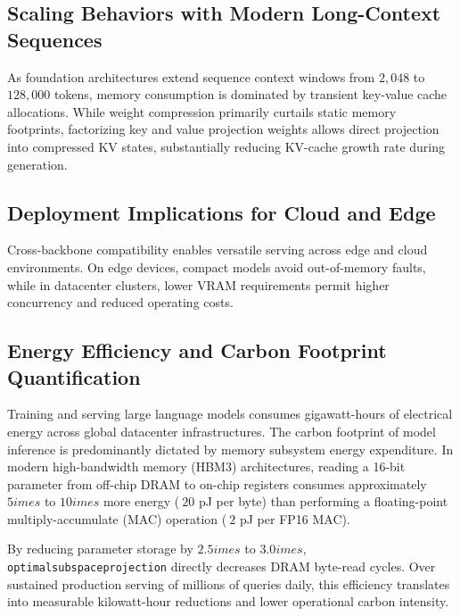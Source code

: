 \subsection{Scaling Behaviors with Modern Long-Context Sequences}
As foundation architectures extend sequence context windows from $2{,}048$ to $128{,}000$ tokens, memory consumption is dominated by transient key-value cache allocations. While weight compression primarily curtails static memory footprints, factorizing key and value projection weights allows direct projection into compressed KV states, substantially reducing KV-cache growth rate during generation.

\subsection{Deployment Implications for Cloud and Edge}
Cross-backbone compatibility enables versatile serving across edge and cloud environments. On edge devices, compact models avoid out-of-memory faults, while in datacenter clusters, lower VRAM requirements permit higher concurrency and reduced operating costs.

\subsection{Energy Efficiency and Carbon Footprint Quantification}
Training and serving large language models consumes gigawatt-hours of electrical energy across global datacenter infrastructures. The carbon footprint of model inference is predominantly dictated by memory subsystem energy expenditure. In modern high-bandwidth memory (HBM3) architectures, reading a 16-bit parameter from off-chip DRAM to on-chip registers consumes approximately $5	imes$ to $10	imes$ more energy ($~20$ pJ per byte) than performing a floating-point multiply-accumulate (MAC) operation ($~2$ pJ per FP16 MAC).

By reducing parameter storage by $2.5	imes$ to $3.0	imes$, \texttt{optimalsubspaceprojection} directly decreases DRAM byte-read cycles. Over sustained production serving of millions of queries daily, this efficiency translates into measurable kilowatt-hour reductions and lower operational carbon intensity.
